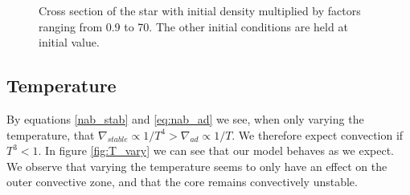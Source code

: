 \documentclass[a4paper,10pt]{article}
\begin{document}
\begin{figure}[H]
\caption{Cross section of the star with initial density multiplied by factors ranging from 0.9 to 70. The other initial conditions are held at initial value.}
\label{fig:rho_vary}
\end{figure}

\subsection{Temperature}
By equations \eqref{nab_stab} and \eqref{eq:nab_ad} we see, when only varying the temperature, that $\nabla_{stable} \propto 1/T^4 > \nabla_{ad} \propto 1/T$. We therefore expect convection if $T^3 < 1$. In figure \eqref{fig:T_vary} we can see that our model behaves as we expect. We observe that varying the temperature seems to only have an effect on the outer convective zone, and that the core remains convectively unstable.
\end{document}

